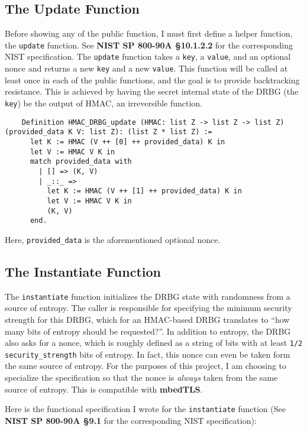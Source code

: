 \documentclass[pageno]{jpaper}
\newcommand{\stdtitle}[1]{\textbf{#1}}
\begin{document}
\subsection{The Update Function}
Before showing any of the public function, I must first define a helper function, the \lstinline{update} function. See \stdtitle{NIST SP 800-90A \S 10.1.2.2} for the corresponding NIST specification. The \lstinline{update} function takes a \lstinline{key}, a \lstinline{value}, and an optional nonce and returns a new \lstinline{key} and a new \lstinline{value}. This function will be called at least once in each of the public functions, and the goal is to provide backtracking resistance. This is achieved by having the secret internal state of the DRBG (the \lstinline{key}) be the output of HMAC, an irreversible function.

\begin{lstlisting}
    Definition HMAC_DRBG_update (HMAC: list Z -> list Z -> list Z) (provided_data K V: list Z): (list Z * list Z) :=
      let K := HMAC (V ++ [0] ++ provided_data) K in
      let V := HMAC V K in
      match provided_data with
        | [] => (K, V)
        | _::_ =>
          let K := HMAC (V ++ [1] ++ provided_data) K in
          let V := HMAC V K in
          (K, V)
      end.
\end{lstlisting}

Here, \lstinline{provided_data} is the aforementioned optional nonce.

\subsection{The Instantiate Function}

The \lstinline{instantiate} function initializes the DRBG state with randomness from a source of entropy. The caller is responsible for specifying the minimum security strength for this DRBG, which for an HMAC-based DRBG translates to “how many bits of entropy should be requested?”. In addition to entropy, the DRBG also asks for a nonce, which is roughly defined as a string of bits with at least \lstinline{1/2 security_strength} bits of entropy. In fact, this nonce can even be taken form the same source of entropy. For the purposes of this project, I am choosing to specialize the specification so that the nonce is \textit{always} taken from the same source of entropy. This is compatible with \stdtitle{mbedTLS}.

Here is the functional specification I wrote for the \lstinline{instantiate} function (See \stdtitle{NIST SP 800-90A \S 9.1} for the corresponding NIST specification):
\end{document}
